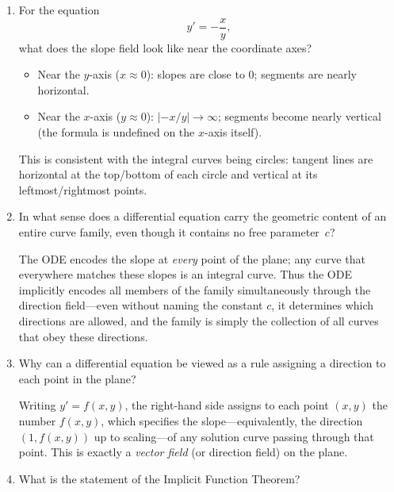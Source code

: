 \documentclass{essay}
\begin{document}
\begin{enumerate}[leftmargin=*, itemsep=8pt]
  \item For the equation \[ y'=-\frac{x}{y}, \] what does the slope
    field look like near the coordinate axes?

    \begin{answer}
      \begin{itemize}
        \item Near the $y$-axis ($x\approx 0$): slopes are close to
          $0$; segments are nearly horizontal.
        \item Near the $x$-axis ($y\approx 0$): $|{-x/y}|\to\infty$;
          segments become nearly vertical (the formula is undefined on
          the $x$-axis itself).
      \end{itemize}
      This is consistent with the integral curves being circles:
      tangent lines are horizontal at the top/bottom of each circle and
      vertical at its leftmost/rightmost points.
    \end{answer}

  \item In what sense does a differential equation carry the
    geometric content of an entire curve family, even though it
    contains no free parameter~$c$?

    \begin{answer} The ODE encodes the slope at \emph{every} point
      of the plane; any curve that everywhere matches these slopes is
      an integral curve.  Thus the ODE implicitly encodes all members
      of the family simultaneously through the direction field---even
      without naming the constant $c$, it determines which directions
      are allowed, and the family is simply the collection of all
      curves that obey these directions.
    \end{answer}

  \item Why can a differential equation be viewed as a rule assigning
    a direction to each point in the plane?

    \begin{answer} Writing $y'=f(x,y)$, the right-hand side assigns
      to each point $(x,y)$ the number $f(x,y)$, which specifies the
      slope---equivalently, the direction $(1, f(x,y))$ up to
      scaling---of any solution curve passing through that point.  This
      is exactly a \emph{vector field} (or direction field) on the plane.
    \end{answer}

  \item What is the statement of the Implicit Function Theorem?


\end{enumerate}
\end{document}

